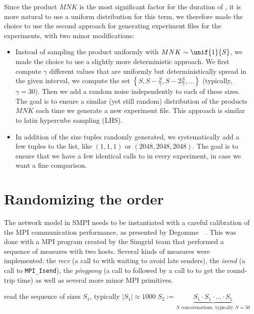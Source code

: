             Since the product \(MNK\) is the most significant factor for the duration of \dgemm, it is more natural to
            use a uniform distribution for this term, we therefore made the choice to use the second approach for
            generating experiment files for the \dgemm experiments, with two minor modifications:
            \begin{itemize}
                \item Instead of sampling the product uniformly with \(MNK\sim\unif{1}{S}\), we made the choice to use a
                    slightly more deterministic approach. We first compute $\gamma$ different values that are uniformly
                    but deterministically spread in the given interval, \ie we compute the set
                    \(\left\{S, S-\frac{S}{\gamma},S-2\frac{S}{\gamma}, \dots\right\}\)
                    (typically, \(\gamma=30\)). Then we add a random noise independently to each of these sizes. The
                    goal is to ensure a similar (yet still random) distribution of the products \(MNK\) each time we
                    generate a new experiment file. This approach is similar to latin hypercube sampling (LHS).
                \item In addition of the size tuples randomly generated, we systematically add a few tuples to the list,
                    like \((1,1,1)\) or \((2048,2048,2048)\). The goal is to ensure that we have a few identical calls to
                    \dgemm in every experiment, in case we want a fine comparison.
            \end{itemize}

    \section{Randomizing the order}%
    \label{sec:randomizing_order}
        The network model in SMPI needs to be instantiated with a careful calibration of the MPI communication
        performance, as presented by Degomme~\etal~\cite{smpi}. This was done with a MPI program created by the Simgrid
        team that performed a sequence of measures with two hosts. Several kinds of measures were implemented: the
        \emph{recv} (a call to \recv with waiting to avoid late senders), the \emph{isend} (a call to
        \texttt{MPI\_Isend}), the \emph{pingpong} (a call to \send followed by a call to \recv to get the round-trip
        time) as well as several more minor MPI primitives.

        \begin{algorithm}[H]
            read the sequence of sizes \(S_1\), typically \(|S_1| \approx 1000\)\;
            \(S_2 := \underbrace{S_1\cdot S_1\cdot\dots\cdot S_1}_{N\text{ concatenations, typically } N\approx 50}\)\;
        \end{algorithm}

